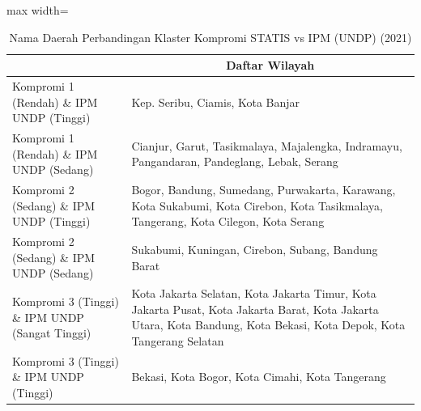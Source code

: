 \begin{table}[H]
\centering
\caption{Nama Daerah Perbandingan Klaster Kompromi STATIS vs IPM (UNDP) (2021)} \label{tab:app1comp_ipm_name_2021}
\begin{adjustbox}{max width=\textwidth}
\begin{tabular}{|>{\centering\arraybackslash}p{4cm}|p{10cm}|}
\hline
\multicolumn{1}{|c|}{\textbf{Kategori}} & \multicolumn{1}{c|}{\textbf{Daftar Wilayah}} \\
\hline
Kompromi 1 (Rendah) \& IPM UNDP (Tinggi) & Kep. Seribu, Ciamis, Kota Banjar \\
\hline
Kompromi 1 (Rendah) \& IPM UNDP (Sedang) & Cianjur, Garut, Tasikmalaya, Majalengka, Indramayu, Pangandaran, Pandeglang, Lebak, Serang \\
\hline
Kompromi 2 (Sedang) \& IPM UNDP (Tinggi) & Bogor, Bandung, Sumedang, Purwakarta, Karawang, Kota Sukabumi, Kota Cirebon, Kota Tasikmalaya, Tangerang, Kota Cilegon, Kota Serang \\
\hline
Kompromi 2 (Sedang) \& IPM UNDP (Sedang) & Sukabumi, Kuningan, Cirebon, Subang, Bandung Barat \\
\hline
Kompromi 3 (Tinggi) \& IPM UNDP (Sangat Tinggi) & Kota Jakarta Selatan, Kota Jakarta Timur, Kota Jakarta Pusat, Kota Jakarta Barat, Kota Jakarta Utara, Kota Bandung, Kota Bekasi, Kota Depok, Kota Tangerang Selatan \\
\hline
Kompromi 3 (Tinggi) \& IPM UNDP (Tinggi) & Bekasi, Kota Bogor, Kota Cimahi, Kota Tangerang \\
\hline
\end{tabular}
\end{adjustbox}
\end{table}